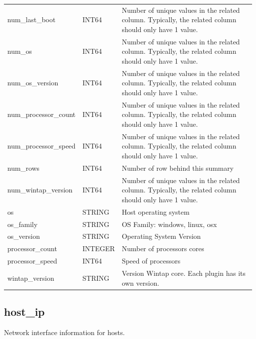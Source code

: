 \documentclass[conference,compsoc]{IEEEtran}
\begin{document}
\begin{longtable}{|p{5cm}|p{2cm}|p{9cm}|}
num\_last\_boot & INT64 & Number of unique values in the related column. Typically, the related column should only have 1 value. \\
num\_os & INT64 & Number of unique values in the related column. Typically, the related column should only have 1 value. \\
num\_os\_version & INT64 & Number of unique values in the related column. Typically, the related column should only have 1 value. \\
num\_processor\_count & INT64 & Number of unique values in the related column. Typically, the related column should only have 1 value. \\
num\_processor\_speed & INT64 & Number of unique values in the related column. Typically, the related column should only have 1 value. \\
num\_rows & INT64 & Number of row behind this summary \\
num\_wintap\_version & INT64 & Number of unique values in the related column. Typically, the related column should only have 1 value. \\
os & STRING & Host operating system \\
os\_family & STRING & OS Family: windows, linux, osx \\
os\_version & STRING & Operating System Version \\
processor\_count & INTEGER & Number of processors cores \\
processor\_speed & INT64 & Speed of processors \\
wintap\_version & STRING & Version Wintap core. Each plugin has its own version. \\
\hline
\end{longtable}

\subsection{host\_ip}
\label{sec:host_ip}

Network interface information for hosts.
\end{document}

